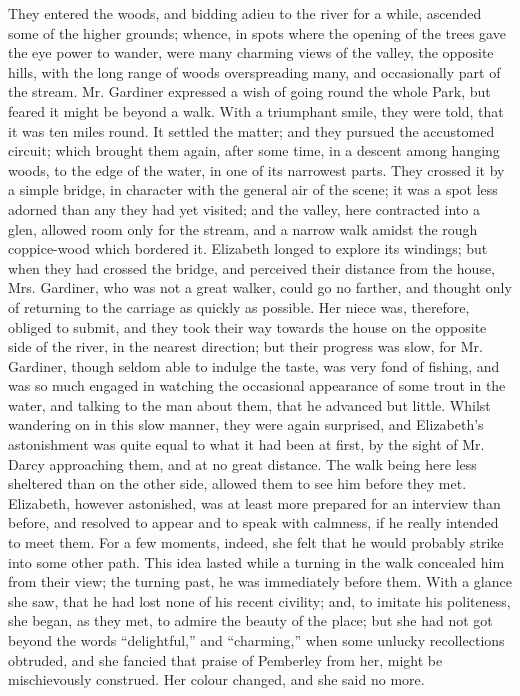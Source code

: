 They entered the woods, and bidding adieu to the river
for a while, ascended some of the higher grounds; whence,
in spots where the opening of the trees gave the eye power
to wander, were many charming views of the valley, the
opposite hills, with the long range of woods overspreading
many, and occasionally part of the stream. Mr. Gardiner
expressed a wish of going round the whole Park, but
feared it might be beyond a walk. With a triumphant
smile, they were told, that it was ten miles round. It
settled the matter; and they pursued the accustomed
circuit; which brought them again, after some time, in
a descent among hanging woods, to the edge of the water,
in one of its narrowest parts. They crossed it by a simple
bridge, in character with the general air of the scene;
it was a spot less adorned than any they had yet visited;
and the valley, here contracted into a glen, allowed room
only for the stream, and a narrow walk amidst the rough
coppice-wood which bordered it. Elizabeth longed to
explore its windings; but when they had crossed the
bridge, and perceived their distance from the house,
Mrs. Gardiner, who was not a great walker, could go no
farther, and thought only of returning to the carriage as
quickly as possible. Her niece was, therefore, obliged to
submit, and they took their way towards the house on
the opposite side of the river, in the nearest direction;
but their progress was slow, for Mr. Gardiner, though
seldom able to indulge the taste, was very fond of fishing,
and was so much engaged in watching the occasional
appearance of some trout in the water, and talking to
the man about them, that he advanced but little. Whilst
wandering on in this slow manner, they were again surprised,
and Elizabeth’s astonishment was quite equal to
what it had been at first, by the sight of Mr. Darcy
approaching them, and at no great distance. The walk
being here less sheltered than on the other side, allowed
them to see him before they met. Elizabeth, however
astonished, was at least more prepared for an interview
than before, and resolved to appear and to speak with
calmness, if he really intended to meet them. For a few
moments, indeed, she felt that he would probably strike
into some other path. This idea lasted while a turning
in the walk concealed him from their view; the turning
past, he was immediately before them. With a glance
she saw, that he had lost none of his recent civility; and,
to imitate his politeness, she began, as they met, to admire
the beauty of the place; but she had not got beyond the
words “delightful,” and “charming,” when some unlucky
recollections obtruded, and she fancied that praise
of Pemberley from her, might be mischievously construed.
Her colour changed, and she said no more.

